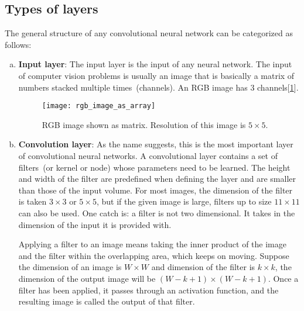 \subsection{Types of layers}
\label{subsection:types_of_layers}
The general structure of any convolutional neural network can be categorized as follows:
\begin{enumerate}[(a)]
    \item \textbf{Input layer}:
        The input layer is the input of any neural network. The input of computer vision problems is usually an image that is basically a matrix of numbers stacked multiple times~(channels). An RGB image has 3 channels[\cref{fig:RGB_image}].
        \begin{figure}[h!]
            \centering
            \texttt{[image: rgb\_image\_as\_array]}
            \caption[RGB image shown as matrix]{RGB image shown as matrix. Resolution of this image is $5\times5$.}
            \label{fig:RGB_image}
        \end{figure}
        
    \item \textbf{Convolution layer}:
        As the name suggests, this is the most important layer of convolutional neural networks. A convolutional layer contains a set of filters~(or kernel or node) whose parameters need to be learned. The height and width of the filter are predefined when defining the layer and are smaller than those of the input volume. For most images, the dimension of the filter is taken $3\times3$ or $5\times5$, but if the given image is large, filters up to size $11\times11$ can also be used. One catch is: a filter is not two dimensional. It takes in the dimension of the input it is provided with.

        Applying a filter to an image means taking the inner product of the image and the filter within the overlapping area, which keeps on moving. Suppose the dimension of an image is $W\times W$ and dimension of the filter is $k\times k$, the dimension of the output image will be $(W-k+1)\times (W-k+1)$. Once a filter has been applied, it passes through an activation function, and the resulting image is called the output of that filter.
    

\end{enumerate}
